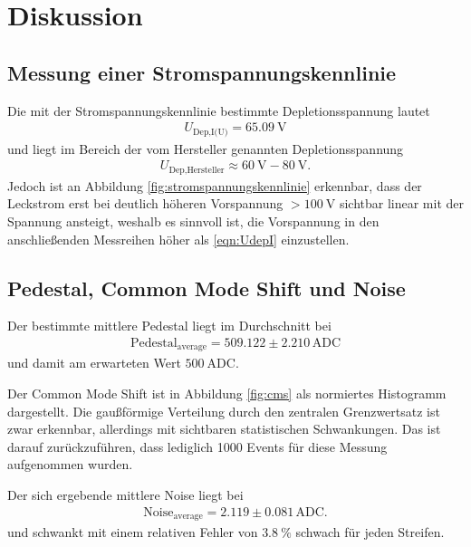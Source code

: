 \section{Diskussion}
\label{sec:Diskussion}

\subsection{Messung einer Stromspannungskennlinie}

Die mit der Stromspannungskennlinie bestimmte Depletionsspannung lautet
\begin{align}
  U_\text{Dep,I(U)} = \SI{65.09}{\volt}
  \label{eqn:UdepI}
\end{align}
und liegt im Bereich der vom Hersteller genannten Depletionsspannung
\begin{align}
  U_\text{Dep,Hersteller} \approx \SI{60}{\volt} - \SI{80}{\volt}.
\end{align}
Jedoch ist an Abbildung \ref{fig:stromspannungskennlinie} erkennbar, dass
der Leckstrom erst bei deutlich höheren Vorspannung $> \SI{100}{\volt}$ sichtbar
linear mit der Spannung ansteigt, weshalb es sinnvoll ist, die Vorspannung in den
anschließenden Messreihen höher als \eqref{eqn:UdepI} einzustellen.

\subsection{Pedestal, Common Mode Shift und Noise}

Der bestimmte mittlere Pedestal liegt im Durchschnitt bei
\begin{align}
  \text{Pedestal}_\text{average} = 509.122 \pm 2.210 \, \text{ADC}
\end{align}
und damit am erwarteten Wert $\SI{500}{\text{ADC}}$.

Der Common Mode Shift ist in Abbildung \ref{fig:cms} als normiertes Histogramm dargestellt.
Die gaußförmige Verteilung durch den zentralen Grenzwertsatz ist zwar erkennbar, allerdings
mit sichtbaren statistischen Schwankungen. Das ist darauf zurückzuführen, dass lediglich
1000 Events für diese Messung aufgenommen wurden.

Der sich ergebende mittlere Noise liegt bei
\begin{align}
  \text{Noise}_\text{average} = 2.119 \pm 0.081 \, \text{ADC}.
  \label{eqn:noise}
\end{align}
und schwankt mit einem relativen Fehler von $\SI{3.8}{\percent}$ schwach für
jeden Streifen.

